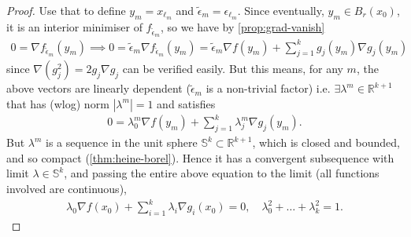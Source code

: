 \begin{proof}
	Use that to define $y_{m} = x_{\ell_{m}}$ and $\tilde{\epsilon}_{m} = \epsilon_{\ell_{m}}$. Since eventually, $y_{m} \in B_{r}(x_{0})$, it is an interior minimiser of $f_{\tilde{\epsilon}_{m}}$, so we have by \ref{prop:grad-vanish}
	\begin{align*}
		0 = \nabla f_{\tilde{\epsilon}_{m}}(y_{m}) \implies 0 = \tilde{\epsilon}_{m} \nabla f_{\tilde{\epsilon}_{m}}(y_{m}) = \tilde{\epsilon}_{m} \nabla f(y_{m}) + \sum_{j=1}^{k} g_{j}(y_{m}) \nabla g_{j}(y_{m})
	\end{align*}
	since $\nabla (g_{j}^{2}) = 2g_{j} \nabla g_{j}$ can be verified easily. But this means, for any $m$, the above vectors are linearly dependent ($\tilde{\epsilon}_{m}$ is a non-trivial factor) i.e. $\exists \lambda^{m} \in \mathbb{R}^{k+1}$ that has (wlog) norm $\left| \lambda^{m} \right| = 1$ and satisfies
	\begin{align*}
		0 = \lambda^{m}_{0} \nabla f(y_{m}) + \sum_{j=1}^{k} \lambda_{j}^{m} \nabla g_{j}(y_{m}).
	\end{align*}
	But $\lambda^{m}$ is a sequence in the unit sphere $\mathbb{S}^{k} \subset \mathbb{R}^{k+1}$, which is closed and bounded, and so compact (\ref{thm:heine-borel}). Hence it has a convergent subsequence with limit $\lambda \in \mathbb{S}^{k}$, and passing the entire above equation to the limit (all functions involved are continuous),
	\begin{align*}
		\lambda_{0} \nabla f(x_{0}) +\sum_{i=1}^{k} \lambda_{i} \nabla g_{i} (x_{0}) = 0, \quad \lambda_{0}^{2} + \dots + \lambda_{k}^{2} = 1.
	\end{align*}
\end{proof}

